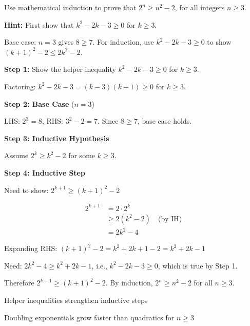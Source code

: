 \begin{problem}
Use mathematical induction to prove that $2^n \ge n^2 - 2$, for all integers $n \ge 3$.

\textbf{Hint:} First show that $k^2 - 2k - 3 \ge 0$ for $k \ge 3$.
\end{problem}

\begin{hint}
Base case: $n=3$ gives $8 \ge 7$. For induction, use $k^2 - 2k - 3 \ge 0$ to show $(k+1)^2 - 2 \le 2k^2 - 2$.
\end{hint}

\begin{solution}
\textbf{Step 1:} Show the helper inequality $k^2 - 2k - 3 \ge 0$ for $k \ge 3$.

Factoring: $k^2 - 2k - 3 = (k-3)(k+1) \ge 0$ for $k \ge 3$.

\textbf{Step 2: Base Case} ($n=3$)

LHS: $2^3 = 8$, RHS: $3^2 - 2 = 7$. Since $8 \ge 7$, base case holds.

\textbf{Step 3: Inductive Hypothesis}

Assume $2^k \ge k^2 - 2$ for some $k \ge 3$.

\textbf{Step 4: Inductive Step}

Need to show: $2^{k+1} \ge (k+1)^2 - 2$

\begin{align*}
2^{k+1} &= 2 \cdot 2^k \\
&\ge 2(k^2 - 2) \quad \text{(by IH)} \\
&= 2k^2 - 4
\end{align*}

Expanding RHS: $(k+1)^2 - 2 = k^2 + 2k + 1 - 2 = k^2 + 2k - 1$

Need: $2k^2 - 4 \ge k^2 + 2k - 1$, i.e., $k^2 - 2k - 3 \ge 0$, which is true by Step 1.

Therefore $2^{k+1} \ge (k+1)^2 - 2$. By induction, $2^n \ge n^2 - 2$ for all $n \ge 3$.
\end{solution}

\begin{takeaways}

\item Helper inequalities strengthen inductive steps
\item Doubling exponentials grow faster than quadratics for $n \ge 3$

\end{takeaways}
